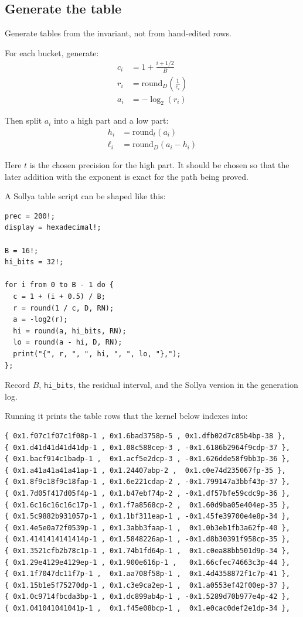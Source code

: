 \documentclass[manuscript, nonacm]{acmart}
\begin{document}
  \subsection{Generate the table}

  Generate tables from the invariant, not from hand-edited rows.

  For each bucket, generate:
  \begin{align*}
    c_i &= 1 + \frac{i + 1/2}{B} \\
    r_i &= \mathrm{round}_D\!\left(\frac{1}{c_i}\right) \\
    a_i &= -\log_2(r_i)
  \end{align*}

  Then split $a_i$ into a high part and a low part:
  \begin{align*}
    h_i &= \mathrm{round}_t(a_i) \\
    \ell_i &= \mathrm{round}_D(a_i - h_i)
  \end{align*}

  Here $t$ is the chosen precision for the high part. It should be chosen so
  that the later addition with the exponent is exact for the path being proved.

  A Sollya table script can be shaped like this:
  \begin{lstlisting}[style=sollya]
prec = 200!;
display = hexadecimal!;

B = 16!;
hi_bits = 32!;

for i from 0 to B - 1 do {
  c = 1 + (i + 0.5) / B;
  r = round(1 / c, D, RN);
  a = -log2(r);
  hi = round(a, hi_bits, RN);
  lo = round(a - hi, D, RN);
  print("{", r, ", ", hi, ", ", lo, "},");
};
  \end{lstlisting}

  Record $B$, \texttt{hi\_bits}, the residual interval, and the Sollya version in
  the generation log.

  Running it prints the table rows that the kernel below indexes into:

  \begin{lstlisting}[style=output]
{ 0x1.f07c1f07c1f08p-1 , 0x1.6bad3758p-5 , 0x1.dfb02d7c85b4bp-38 },
{ 0x1.d41d41d41d41dp-1 , 0x1.08c588cep-3 , -0x1.6186b2964f9cdp-37 },
{ 0x1.bacf914c1badp-1 ,  0x1.acf5e2dcp-3 , -0x1.626dde58f9bb3p-36 },
{ 0x1.a41a41a41a41ap-1 , 0x1.24407abp-2 ,  0x1.c0e74d235067fp-35 },
{ 0x1.8f9c18f9c18fap-1 , 0x1.6e221cdap-2 , -0x1.799147a3bbf43p-37 },
{ 0x1.7d05f417d05f4p-1 , 0x1.b47ebf74p-2 , -0x1.df57bfe59cdc9p-36 },
{ 0x1.6c16c16c16c17p-1 , 0x1.f7a8568cp-2 ,  0x1.60d9ba05e404ep-35 },
{ 0x1.5c9882b931057p-1 , 0x1.1bf311eap-1 , -0x1.45fe39700e4e8p-34 },
{ 0x1.4e5e0a72f0539p-1 , 0x1.3abb3faap-1 ,  0x1.0b3eb1fb3a62fp-40 },
{ 0x1.4141414141414p-1 , 0x1.5848226ap-1 , -0x1.d8b30391f958cp-35 },
{ 0x1.3521cfb2b78c1p-1 , 0x1.74b1fd64p-1 ,  0x1.c0ea88bb501d9p-34 },
{ 0x1.29e4129e4129ep-1 , 0x1.900e616p-1 ,   0x1.66cfec74663c3p-44 },
{ 0x1.1f7047dc11f7p-1 ,  0x1.aa708f58p-1 ,  0x1.4d4358872f1c7p-41 },
{ 0x1.15b1e5f75270dp-1 , 0x1.c3e9ca2ep-1 ,  0x1.a0553ef42f00ep-37 },
{ 0x1.0c9714fbcda3bp-1 , 0x1.dc899ab4p-1 , -0x1.5289d70b977e4p-42 },
{ 0x1.041041041041p-1 ,  0x1.f45e08bcp-1 ,  0x1.e0cac0def2e1dp-34 },
  \end{lstlisting}
\end{document}

